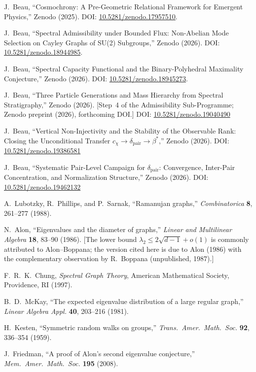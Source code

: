 J.~Beau,
``Cosmochrony: A Pre-Geometric Relational Framework for Emergent Physics,''
Zenodo (2025).
DOI: \href{https://doi.org/10.5281/zenodo.17957510}{10.5281/zenodo.17957510}.

J.~Beau,
``Spectral Admissibility under Bounded Flux: Non-Abelian Mode Selection on
Cayley Graphs of SU(2) Subgroups,''
Zenodo (2026).
DOI: \href{https://doi.org/10.5281/zenodo.18944985}{10.5281/zenodo.18944985}.

J.~Beau,
``Spectral Capacity Functional and the Binary-Polyhedral Maximality
Conjecture,''
Zenodo (2026).
DOI: \href{https://doi.org/10.5281/zenodo.18945273}{10.5281/zenodo.18945273}.

J.~Beau,
``Three Particle Generations and Mass Hierarchy from Spectral Stratigraphy,''
Zenodo (2026).
[Step~4 of the Admissibility Sub-Programme; Zenodo preprint (2026), forthcoming DOI.]
DOI: \href{https://doi.org/10.5281/zenodo.19040490}{10.5281/zenodo.19040490}

J.~Beau,
``Vertical Non-Injectivity and the Stability of the Observable Rank:
Closing the Unconditional Transfer $c_\chi \to \delta_{\mathrm{pair}} \to \beta^*$,''
Zenodo (2026).
DOI: \href{https://doi.org/10.5281/zenodo.19386581}{10.5281/zenodo.19386581}

J.~Beau,
``Systematic Pair-Level Campaign for $\delta_{\mathrm{pair}}$:
Convergence, Inter-Pair Concentration, and Normalization Structure,''
Zenodo (2026).
DOI: \href{https://doi.org/10.5281/zenodo.19462132}{10.5281/zenodo.19462132}

A.~Lubotzky, R.~Phillips, and P.~Sarnak,
``Ramanujan graphs,''
\emph{Combinatorica} \textbf{8}, 261--277 (1988).

N.~Alon,
``Eigenvalues and the diameter of graphs,''
\emph{Linear and Multilinear Algebra} \textbf{18}, 83--90 (1986).
[The lower bound $\lambda_2 \leq 2\sqrt{d-1} + o(1)$ is commonly attributed to
Alon--Boppana; the version cited here is due to Alon (1986) with the
complementary observation by R.~Boppana (unpublished, 1987).]

F.~R.~K.~Chung,
\emph{Spectral Graph Theory},
American Mathematical Society, Providence, RI (1997).

B.~D.~McKay,
``The expected eigenvalue distribution of a large regular graph,''
\emph{Linear Algebra Appl.} \textbf{40}, 203--216 (1981).

H.~Kesten,
``Symmetric random walks on groups,''
\emph{Trans.\ Amer.\ Math.\ Soc.} \textbf{92}, 336--354 (1959).

J.~Friedman,
``A proof of Alon's second eigenvalue conjecture,''
\emph{Mem.\ Amer.\ Math.\ Soc.} \textbf{195} (2008).
